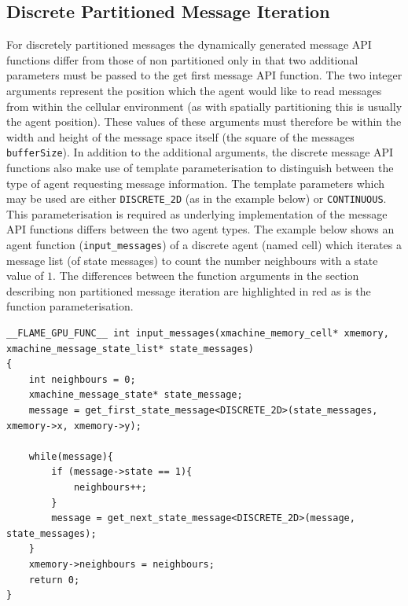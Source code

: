 \documentclass[11pt, a4paper, onecolumn, oneside]{report}
\begin{document}
\subsection{Discrete Partitioned Message Iteration}
\label{sec:353}


For discretely partitioned messages the dynamically generated message API functions differ from those of non partitioned only in that two additional parameters must be passed to the get first message API function.
The two integer arguments represent the position which the agent would like to read messages from within the cellular environment (as with spatially partitioning this is usually the agent position).
These values of these arguments must therefore be within the width and height of the message space itself (the square of the messages \texttt{bufferSize}).
In addition to the additional arguments, the discrete message API functions also make use of template parameterisation to distinguish between the type of agent requesting message information.
The template parameters which may be used are either \texttt{DISCRETE_2D} (as in the example below) or \texttt{CONTINUOUS}.
This parameterisation is required as underlying implementation of the message API functions differs between the two agent types.
The example below shows an agent function (\texttt{input_messages}) of a discrete agent (named cell) which iterates a message list (of state messages) to count the number neighbours with a state value of $1$.
The differences between the function arguments in the section describing non partitioned message iteration are highlighted in red as is the function parameterisation.

\begin{lstlisting}[language=C_]
__FLAME_GPU_FUNC__ int input_messages(xmachine_memory_cell* xmemory, xmachine_message_state_list* state_messages)
{
    int neighbours = 0;
    xmachine_message_state* state_message;
    message = get_first_state_message<DISCRETE_2D>(state_messages, xmemory->x, xmemory->y);
    
    while(message){
        if (message->state == 1){
            neighbours++;
        }
        message = get_next_state_message<DISCRETE_2D>(message, state_messages);
    }
    xmemory->neighbours = neighbours;
    return 0;
}
\end{lstlisting}

\end{document}
